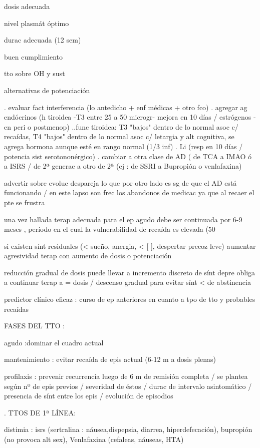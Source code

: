 dosis adecuada

nivel plasmát óptimo

durac adecuada (12 sem)

buen cumplimiento

tto sobre OH y sust

alternativas de potenciación

. evaluar fact interferencia (lo antedicho + enf médicas + otro fco)
. agregar ag endócrinos (h tiroidea -T3 entre 25 a 50 microgr- mejora en 10 días / estrógenos - en peri o postmenop)
..func tiroidea: T3 "bajos" dentro de lo normal asoc c/ recaídas, T4 "bajos" dentro de lo normal asoc c/ letargia y alt cognitiva, se agrega hormona aunque esté en rango normal (1/3 inf)
. Li (resp en 10 días / potencia sist serotononérgico)
. cambiar a otra clase de AD ( de TCA a IMAO ó a ISRS / de 2ª generac a otro de 2ª (ej : de SSRI a Bupropión o venlafaxina)

advertir sobre evoluc despareja lo que por otro lado es sg de que el AD está funcionando / en este lapso son frec los abandonos de medicac ya que al recaer el pte se frustra

una vez hallada terap adecuada para el ep agudo debe ser continuada por 6-9 meses , período en el cual la vulnerabilidad de recaída es elevada (50%

si existen sínt residuales (< sueño, anergia, < [ ], despertar precoz leve) aumentar agresividad terap con aumento de dosis o potenciación

reducción gradual de dosis puede llevar a incremento discreto de sínt depre obliga a continuar terap a = dosis / descenso gradual para evitar sínt < de abstinencia

predictor clínico eficaz : curso de ep anteriores en cuanto a tpo de tto y probables recaídas

FASES DEL TTO :

agudo :dominar el cuadro actual

mantenimiento : evitar recaída de epis actual (6-12 m a dosis plenas)

profilaxis : prevenir recurrencia luego de 6 m de remisión completa / se plantea según nº de epis previos / severidad de éstos / durac de intervalo asintomático / presencia de sínt entre los epis / evolución de episodios

. TTOS DE 1ª LÍNEA:

distimia : isrs (sertralina : náusea,dispepsia, diarrea, hiperdefecación), bupropión (no provoca alt sex), Venlafaxina (cefaleas, náuseas, HTA)

